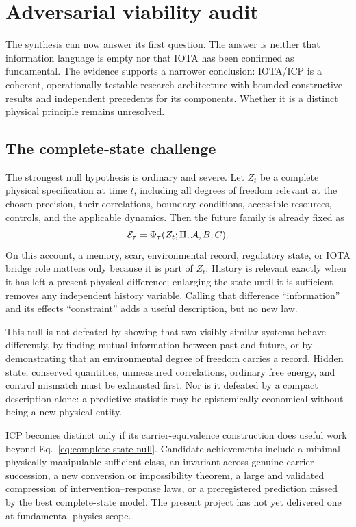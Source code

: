 \section{Adversarial viability audit}

The synthesis can now answer its first question. The answer is neither that
information language is empty nor that IOTA has been confirmed as fundamental.
The evidence supports a narrower conclusion: IOTA/ICP is a coherent,
operationally testable research architecture with bounded constructive results
and independent precedents for its components. Whether it is a distinct
physical principle remains unresolved.

\subsection{The complete-state challenge}

The strongest null hypothesis is ordinary and severe. Let $Z_t$ be a complete
physical specification at time $t$, including all degrees of freedom relevant
at the chosen precision, their correlations, boundary conditions, accessible
resources, controls, and the applicable dynamics. Then the future family is
already fixed as
\begin{equation}
  \mathcal{E}_{\tau}=\Phi_{\tau}(Z_t;\Pi,\mathcal A,B,C).
  \label{eq:complete-state-null}
\end{equation}
On this account, a memory, scar, environmental record, regulatory state, or
IOTA bridge role matters only because it is part of $Z_t$. History is relevant
exactly when it has left a present physical difference; enlarging the state
until it is sufficient removes any independent history variable. Calling that
difference ``information'' and its effects ``constraint'' adds a useful
description, but no new law.

This null is not defeated by showing that two visibly similar systems behave
differently, by finding mutual information between past and future, or by
demonstrating that an environmental degree of freedom carries a record. Hidden
state, conserved quantities, unmeasured correlations, ordinary free energy,
and control mismatch must be exhausted first. Nor is it defeated by a compact
description alone: a predictive statistic may be epistemically economical
without being a new physical entity.

ICP becomes distinct only if its carrier-equivalence construction does useful
work beyond Eq.~\eqref{eq:complete-state-null}. Candidate achievements include
a minimal physically manipulable sufficient class, an invariant across genuine
carrier succession, a new conversion or impossibility theorem, a large and
validated compression of intervention--response laws, or a preregistered
prediction missed by the best complete-state model. The present project has
not yet delivered one at fundamental-physics scope.

